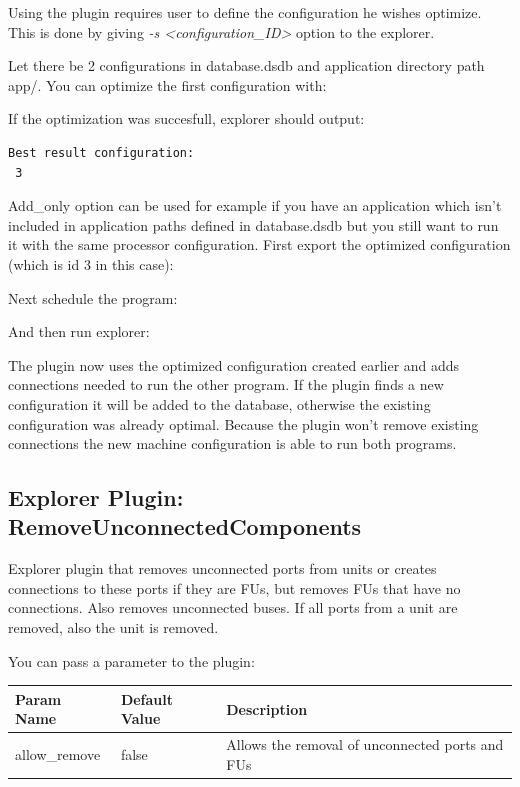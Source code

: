 \documentclass[twoside]{tceusermanual}
\begin{document}
Using the plugin requires user to define the configuration he wishes optimize.
This is done by giving \textit{-s <configuration\_ID>} option to the explorer.

Let there be 2 configurations in database.dsdb and application directory path app/.
You can optimize the first configuration with:


If the optimization was succesfull, explorer should output:
\begin{verbatim}
Best result configuration:
 3
\end{verbatim}
Add\_only option can be used for example if you have an application which isn't
included in application paths defined in database.dsdb but you still want to run
it with the same processor configuration.
First export the optimized configuration (which is id 3 in this case):


Next schedule the program:


And then run explorer:


The plugin now uses the optimized configuration created earlier and adds
connections needed to run the other program. If the plugin finds a new 
configuration it will be added to the database, otherwise the existing
configuration was already optimal. Because the plugin won't
remove existing connections the new machine configuration is able to run
both programs.

\subsection{Explorer Plugin: RemoveUnconnectedComponents}
Explorer plugin that removes unconnected ports from units or creates
connections to these ports if they are FUs, but removes FUs that have no 
connections. Also removes unconnected buses. If all ports from a unit 
are removed, also the unit is removed.

You can pass a parameter to the plugin:

\begin{tabular}{p{}p{}
                p{}}
\textbf{Param Name} &\textbf{Default Value} &\textbf{Description} \\
\hline
allow\_remove & false & Allows the removal of unconnected ports and FUs \\
\end{tabular}\\
\end{document}
